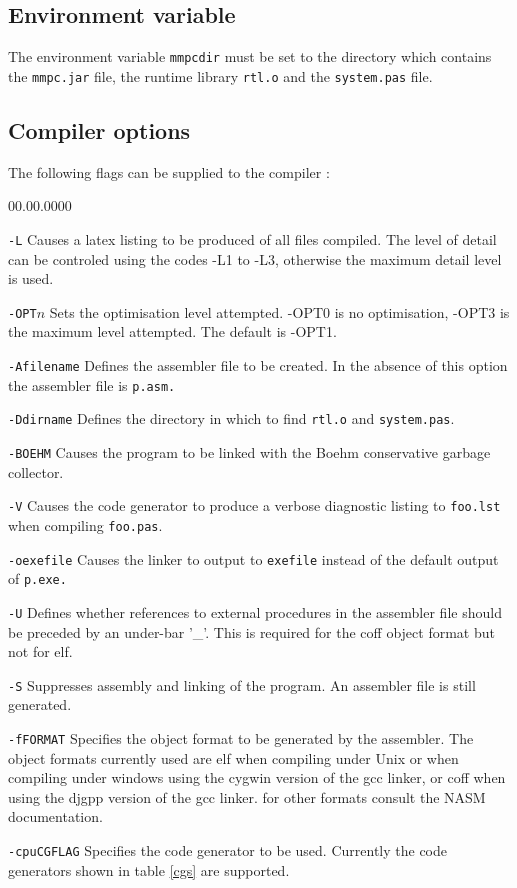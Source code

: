 {\subsection{Environment variable}

The environment variable \texttt{mmpcdir} must be set to the
directory which contains the \texttt{mmpc.jar} file, the runtime
library \texttt{rtl.o} and the \texttt{system.pas} file.


\subsection{Compiler options}
\label{comp:opt}
The following flags can be supplied to the compiler :

\begin{lyxlist}{00.00.0000}
\item[\texttt{-L}] Causes a latex listing to be produced of
all files compiled. The level of detail can be controled
using the codes -L1 to -L3, otherwise the maximum detail level is used.
\item[\texttt{-OPT$n$}] Sets the optimisation level attempted.
-OPT0 is no optimisation, -OPT3 is the maximum level attempted. 
The default is -OPT1.
\item [\texttt{-Afilename\index{-Afilename}}]Defines the assembler file to be created.
In the absence of this option the assembler file is \texttt{p.asm.}
\item [\texttt{-Ddirname\index{-Ddirname}}]Defines the directory in which to find
\texttt{rtl.o} and \texttt{system.pas}.
\item [\texttt{-BOEHM}\index{-BOEHM}\index{garbage collection}\label{garbage}\label{BOEHM}]
Causes the program to be linked with the Boehm conservative garbage
collector.
\item [\texttt{-V\index{-V}}]Causes the code generator to produce a verbose diagnostic
listing to \texttt{foo.lst} when compiling \texttt{foo.pas}.
\item [\texttt{-oexefile\index{-oexefile}}]Causes the linker to output to \texttt{exefile}
instead of the default output of \texttt{p.exe.}
\item [\texttt{-U\index{-U}}]Defines whether references to external procedures in
the assembler file should be preceded by an under-bar '\_'. This is required
for the coff object format but not for elf.
\item [\texttt{-S\index{-S}}]Suppresses assembly and linking of the program. An assembler
file is still generated.
\item [\texttt{-fFORMAT\index{-fFORMAT}}]Specifies the object format to be generated
by the assembler. The object formats currently used are elf when compiling under
Unix or when compiling under windows using the cygwin version of the gcc linker,
or coff when using the djgpp version of the gcc linker. for other formats consult
the NASM documentation.
\item [\texttt{-cpuCGFLAG\index{-cpuCGFLAG}}]Specifies the code generator to be used.
Currently the code generators shown in table \ref{cgs} are supported.
\item 
\begin{table}


\end{table}
\end{lyxlist}}

